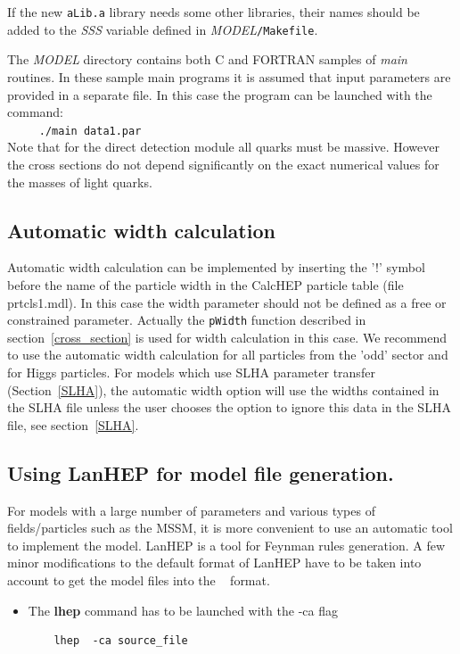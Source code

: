 \documentclass[12pt,a4paper]{article}
\begin{document}
{\begin{itemize}
If the new \verb|aLib.a| library needs some other libraries, their
names should be added to the {\it SSS} variable defined in {\it MODEL}\verb|/Makefile|.
\end{itemize}

The {\it MODEL} directory contains both  C and FORTRAN samples of {\it main}
routines. In these sample main programs it is assumed that input parameters are provided in a separate
file. In this case the  program can be launched with the command:\\
\verb|     ./main data1.par|\\
Note that for the direct detection module all quarks must be  massive. 
However the cross sections do not depend significantly on the exact  
numerical values for the masses of light quarks.

 
\subsection{Automatic width calculation}
Automatic width calculation can be 
implemented by  inserting the '!' symbol before the name of the particle width  in 
the CalcHEP particle table (file prtcls1.mdl). In this case the width parameter 
should not be defined as a free or constrained parameter. 
Actually the \verb|pWidth| function  described in section~\ref{cross_section} is  used for width calculation in this case.
We recommend to use the
automatic width calculation for all particles from the 'odd' sector and for
Higgs particles. 
For models which use SLHA parameter transfer (Section~\ref{SLHA}), 
the automatic width option will use the widths contained in the SLHA file unless the user chooses the option to
ignore this data in the SLHA file, see section~\ref{SLHA}. 


\subsection{Using LanHEP for model file generation.}

For models with a large number of parameters and various types of fields/particles such as  the MSSM, it is more convenient to use an automatic tool to implement 
the model.  LanHEP is a  tool for Feynman  rules  generation. A few minor
modifications to the default format of LanHEP have to be taken into account to get the model files into
the \micro~ format. 
\begin{itemize}
\item  The {\bf lhep}  command has to be launched with the {-ca} flag  
\begin{verbatim}
    lhep  -ca source_file 
\end{verbatim}


\end{itemize}}
\end{document}
